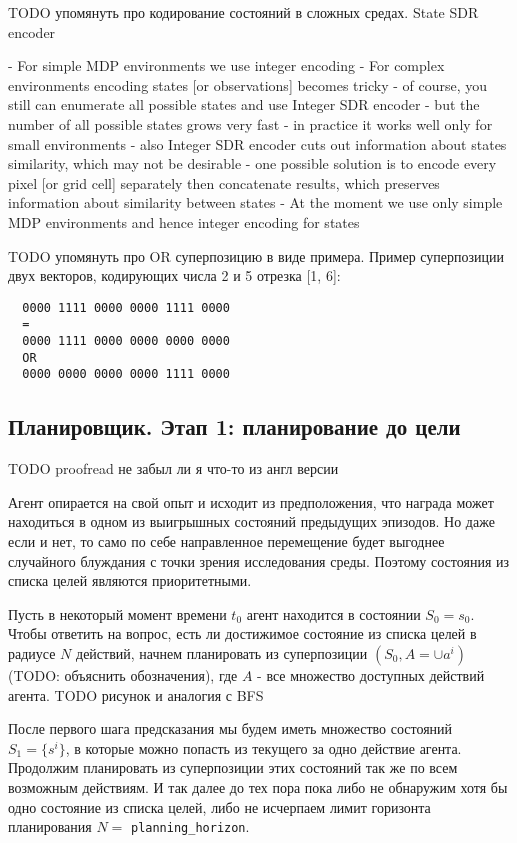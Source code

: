 \documentclass[a4paper]{article}
\begin{document}
TODO упомянуть про кодирование состояний в сложных средах. State SDR encoder

- For simple MDP environments we use integer encoding
- For complex environments encoding states [or observations] becomes tricky
  - of course, you still can enumerate all possible states and use Integer SDR encoder
  - but the number of all possible states grows very fast
    - in practice it works well only for small environments
  - also Integer SDR encoder cuts out information about states similarity, which may not be desirable
  - one possible solution is to encode every pixel [or grid cell] separately then concatenate results, which preserves information about similarity between states
- At the moment we use only simple MDP environments and hence integer encoding for states

TODO упомянуть про OR суперпозицию в виде примера. Пример суперпозиции двух векторов, кодирующих числа 2 и 5 отрезка [1, 6]:

\begin{verbatim}
  0000 1111 0000 0000 1111 0000
  =
  0000 1111 0000 0000 0000 0000
  OR
  0000 0000 0000 0000 1111 0000
\end{verbatim}

\subsection{Планировщик. Этап 1: планирование до цели}

TODO proofread не забыл ли я что-то из англ версии

Агент опирается на свой опыт и исходит из предположения, что награда может находиться в одном из выигрышных состояний предыдущих эпизодов. Но даже если и нет, то само по себе направленное перемещение будет выгоднее случайного блуждания с точки зрения исследования среды. Поэтому состояния из списка целей являются приоритетными.

Пусть в некоторый момент времени $t_0$ агент находится в состоянии $S_0 = s_0$. Чтобы ответить на вопрос, есть ли достижимое состояние из списка целей в радиусе $N$ действий, начнем планировать из суперпозиции $(S_0, A = \cup a^i)$ (TODO: объяснить обозначения), где $A$ - все множество доступных действий агента.
TODO рисунок и аналогия с BFS

После первого шага предсказания мы будем иметь множество состояний $S_1 = \{s^i\}$, в которые можно попасть из текущего за одно действие агента. Продолжим планировать из суперпозиции этих состояний так же по всем возможным действиям. И так далее до тех пора пока либо не обнаружим хотя бы одно состояние из списка целей, либо не исчерпаем лимит горизонта планирования $N =$ \verb|planning_horizon|.
\end{document}
